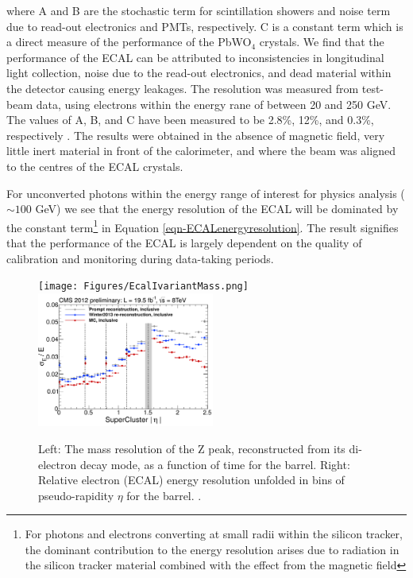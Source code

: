 where A and B are the stochastic term for scintillation showers and noise term due to read-out electronics and PMTs, respectively. C is a constant term which is a direct measure of the performance of the PbWO$_4$ crystals. We find that the performance of the ECAL can be attributed to inconsistencies in longitudinal light collection, noise due to the read-out electronics, and dead material within the detector causing energy leakages. The resolution was measured from test-beam data, using electrons within the energy rane of between 20 and 250 GeV. The values of A, B, and C have been measured to be 2.8\%, 12\%, and 0.3\%, respectively \cite{CMSexperiment}. The results were obtained in the absence of magnetic field, very little inert material in front of the calorimeter, and where the beam was aligned to the centres of the ECAL crystals. 

For unconverted photons within the energy range of interest for physics analysis ($\sim100$ GeV) we see that the energy resolution of the ECAL will be dominated by the constant term\footnote{For photons and electrons converting at small radii within the silicon tracker, the dominant contribution to the energy resolution arises due to radiation in the silicon tracker material combined with the effect from the magnetic field} in Equation \ref{eqn-ECALenergyresolution}. The result signifies that the performance of the ECAL is largely dependent on the quality of calibration and monitoring during data-taking periods. 

\begin{figure} \label{fig-ECALperformance}
\texttt{[image: Figures/EcalIvariantMass.png]}
\includegraphics[width=0.52\textwidth]{Figures/EcalEtaInclusive.png}
\caption{Left: The mass resolution of the Z peak, reconstructed from its di-electron decay mode, as a function of time for the barrel. Right: Relative electron (ECAL) energy resolution unfolded in bins of pseudo-rapidity $\eta$ for the barrel. \cite{ECALPerformance}.}
\end{figure}


